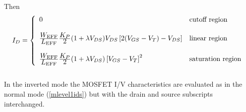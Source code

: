 Then
\begin{equation}
I_{D} = \left\{ \begin{array}{ll}
      0  & \mbox{cutoff region} \\ \\
      { {\textstyle W_{\ms{EFF}}} \over {\textstyle L_{\ms{EFF}}}}
      {{\textstyle \KP} \over {\textstyle 2}} 
      ( 1+\LAMBDA V_{DS})
      V_{DS} \left[2(V_{GS}-V_{T})-V_{DS}\right]
         &\mbox{linear region} \\ \\
      { {\textstyle W_{\ms{EFF}}} \over {\textstyle L_{\ms{EFF}}}}
      {{\textstyle \KP} \over {\textstyle 2}} 
      (1+\LAMBDA V_{DS})
      \left[V_{GS}-V_{T}\right]^2
         &\mbox{saturation region} \end{array} \right. %
      \label{mlevel1ids}
\end{equation}
\\[0.2in]
In the inverted mode the MOSFET I/V characteristics are evaluated as in the
normal mode (\ref{mlevel1ids}) but with the drain and source subscripts
interchanged.

